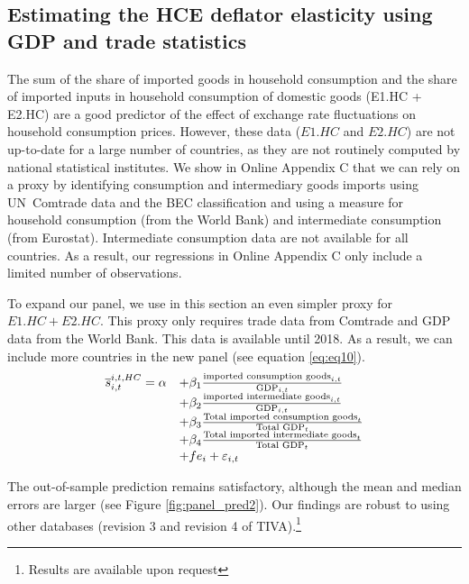 \documentclass[12pt,a4paper]{paper}
\begin{document}
\subsection{Estimating the HCE deflator elasticity using GDP and trade statistics}
The sum of the share of imported goods in household consumption and the share of imported inputs in household consumption of domestic goods (E1.HC + E2.HC) are a good predictor of the effect of exchange rate fluctuations on household consumption prices. 
However, these data ($E1.HC$ and $E2.HC$) are not up-to-date for a large number of countries, as they are not routinely computed by national statistical institutes.
We show in Online Appendix C that we can rely on a proxy by identifying consumption and intermediary goods imports using UN Comtrade data and the BEC classification and using a measure for household consumption (from the World Bank) and intermediate consumption (from Eurostat).
Intermediate consumption data are not available for all countries.
As a result, our regressions in Online Appendix C only include a limited number of observations.

To expand our panel, we use in this section an even simpler proxy for $E1.HC+E2.HC$. 
This proxy only requires trade data from Comtrade and GDP data from the World Bank. This data is available until 2018. 
As a result, we can include more countries in the new panel (see equation \ref{eq:eq10}).
 \begin{equation}
\begin{array}{llll}
\overline{s}_{i,t}^{i,t,HC}= \alpha & +  \beta_1  \frac{\textnormal{imported consumption goods}_{i,t}}{\textnormal{GDP}_{i,t}} \\ & + \beta_2 \frac{\textnormal{imported intermediate goods}_{i,t}}{\textnormal{GDP}_{i,t}} \\
& +  \beta_3  \frac{\textnormal{Total imported consumption goods}_{t}}{\textnormal{Total GDP}_{t}} \\
& + \beta_4 \frac{\textnormal{Total imported intermediate goods}_{t}}{\textnormal{Total GDP}_{t}} \\
& +fe_{i}+\varepsilon_{i,t}
\end{array}
\label{eq:eq10}
\end{equation}

The out-of-sample prediction remains satisfactory, although the mean and median errors are larger (see Figure \ref{fig:panel_pred2}). 
Our findings are robust to using other databases (revision 3 and revision 4 of TIVA).\footnote{Results are available upon request}
\end{document}
